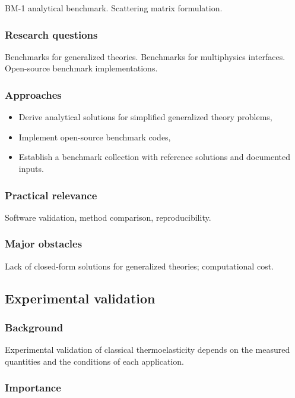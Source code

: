 BM-1 analytical benchmark. Scattering matrix formulation.

\subsubsection{Research questions}

Benchmarks for generalized theories. Benchmarks for multiphysics interfaces. Open-source benchmark implementations.

\subsubsection{Approaches}

\begin{itemize}
\item Derive analytical solutions for simplified generalized theory problems,
\item Implement open-source benchmark codes,
\item Establish a benchmark collection with reference solutions and documented inputs.
\end{itemize}

\subsubsection{Practical relevance}

Software validation, method comparison, reproducibility.

\subsubsection{Major obstacles}

Lack of closed-form solutions for generalized theories; computational cost.

\subsection{Experimental validation}
\label{sec:experimental-validation}

\subsubsection{Background}

Experimental validation of classical thermoelasticity depends on the measured quantities and the conditions of each application.

\subsubsection{Importance}

